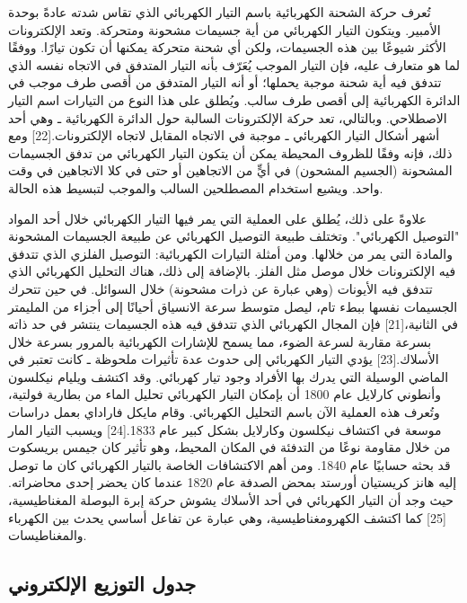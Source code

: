 \documentclass[a4paper]{book}
\begin{document}
\begin{multicols}{3}
  تُعرف حركة الشحنة الكهربائية باسم التيار الكهربائي الذي تقاس شدته
  عادةً بوحدة الأمبير. ويتكون التيار الكهربائي من أية جسيمات مشحونة
  ومتحركة. وتعد الإلكترونات الأكثر شيوعًا بين هذه الجسيمات، ولكن أي
  شحنة متحركة يمكنها أن تكون تيارًا. ووفقًا لما هو متعارف عليه، فإن
  التيار الموجب يُعَرّف بأنه التيار المتدفق في الاتجاه نفسه الذي تتدفق
  فيه أية شحنة موجبة يحملها؛ أو أنه التيار المتدفق من أقصى طرف موجب في
  الدائرة الكهربائية إلى أقصى طرف سالب. ويُطلق على هذا النوع من
  التيارات اسم التيار الاصطلاحي. وبالتالي، تعد حركة الإلكترونات
  السالبة حول الدائرة الكهربائية ـ وهي أحد أشهر أشكال التيار الكهربائي
  ـ موجبة في الاتجاه المقابل لاتجاه الإلكترونات.[22] ومع ذلك، فإنه
  وفقًا للظروف المحيطة يمكن أن يتكون التيار الكهربائي من تدفق الجسيمات
  المشحونة (الجسيم المشحون) في أيٍّ من الاتجاهين أو حتى في كلا الاتجاهين
  في وقت واحد. ويشيع استخدام المصطلحين السالب والموجب لتبسيط هذه
  الحالة.

  علاوةً على ذلك، يُطلق على العملية التي يمر فيها التيار الكهربائي خلال
  أحد المواد "التوصيل الكهربائي". وتختلف طبيعة التوصيل الكهربائي عن
  طبيعة الجسيمات المشحونة والمادة التي يمر من خلالها. ومن أمثلة
  التيارات الكهربائية: التوصيل الفلزي الذي تتدفق فيه الإلكترونات خلال
  موصل مثل الفلز. بالإضافة إلى ذلك، هناك التحليل الكهربائي الذي تتدفق
  فيه الأيونات (وهي عبارة عن ذرات مشحونة) خلال السوائل. في حين تتحرك
  الجسيمات نفسها ببطء تام، ليصل متوسط سرعة الانسياق أحيانًا إلى أجزاء
  من المليمتر في الثانية،[21] فإن المجال الكهربائي الذي تتدفق فيه هذه
  الجسيمات ينتشر في حد ذاته بسرعة مقاربة لسرعة الضوء، مما يسمح
  للإشارات الكهربائية بالمرور بسرعة خلال الأسلاك.[23] يؤدي التيار
  الكهربائي إلى حدوث عدة تأثيرات ملحوظة ـ كانت تعتبر في الماضي الوسيلة
  التي يدرك بها الأفراد وجود تيار كهربائي. وقد اكتشف ويليام نيكلسون
  وأنطوني كارلايل عام 1800 أن بإمكان التيار الكهربائي تحليل الماء من
  بطارية فولتية، وتُعرف هذه العملية الآن باسم التحليل الكهربائي. وقام
  مايكل فاراداي بعمل دراسات موسعة في اكتشاف نيكلسون وكارلايل بشكل كبير
  عام 1833.[24] ويسبب التيار المار من خلال مقاومة نوعًا من التدفئة في
  المكان المحيط، وهو تأثير كان جيمس بريسكوت قد بحثه حسابيًا عام
  1840. ومن أهم الاكتشافات الخاصة بالتيار الكهربائي كان ما توصل إليه
  هانز كريستيان أورستد بمحض الصدفة عام 1820 عندما كان يحضر إحدى
  محاضراته. حيث وجد أن التيار الكهربائي في أحد الأسلاك يشوش حركة إبرة
  البوصلة المغناطيسية،[25] كما اكتشف الكهرومغناطيسية، وهي عبارة عن
  تفاعل أساسي يحدث بين الكهرباء والمغناطيسات.
\end{multicols}

\subsection{جدول التوزيع الإلكتروني}
\end{document}
